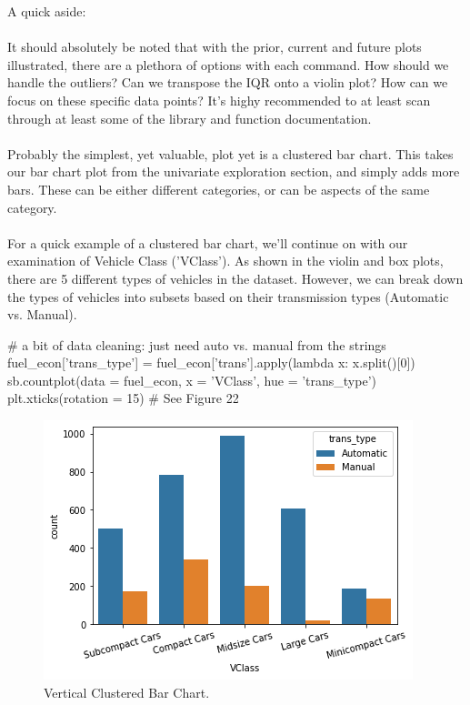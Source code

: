 \newpage
A quick aside:
\\\\

It should absolutely be noted that with the prior, current and future plots illustrated, there are a plethora of options with each command. How should we handle the outliers? Can we transpose the IQR onto a violin plot? How can we focus on these specific data points? It's highy recommended to at least scan through at least some of the library and function documentation.
\\\\

Probably the simplest, yet valuable, plot yet is a clustered bar chart. This takes our bar chart plot from the univariate exploration section, and simply adds more bars. These can be either different categories, or can be aspects of the same category.
\\\\

For a quick example of a clustered bar chart, we'll continue on with our examination of Vehicle Class ('VClass'). As shown in the violin and box plots, there are 5 different types of vehicles in the dataset. However, we can break down the types of vehicles into subsets based on their transmission types (Automatic vs. Manual).

\begin{python}
	# a bit of data cleaning: just need auto vs. manual from the strings
	fuel_econ['trans_type'] = fuel_econ['trans'].apply(lambda x: x.split()[0])
	sb.countplot(data = fuel_econ, x = 'VClass', hue = 'trans_type')
	plt.xticks(rotation = 15)
	# See Figure 22
\end{python}

\begin{figure}
	\includegraphics{images/figure22.png}
	\caption{Vertical Clustered Bar Chart.}\label{fig:figure22}
\end{figure}

